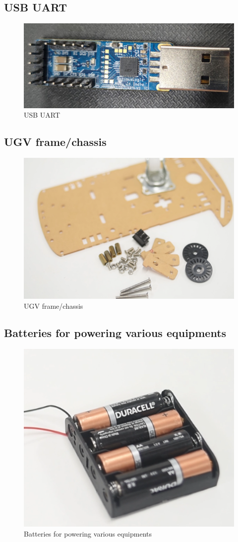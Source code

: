 \begin{enumerate}[label=\thesection.\arabic*.,ref=\thesection.\theenumi]
\subsection{USB UART}
\begin{figure}[H]
\centering
\includegraphics[width=0.5\columnwidth]{figs/uart.jpg}
\caption{USB UART}
\label{fig:usb-uart}
\end{figure}
\subsection{UGV frame/chassis}
\begin{figure}[H]
\centering
\includegraphics[width=0.5\columnwidth]{figs/base.png}
\caption{UGV frame/chassis}
\end{figure}


\subsection{Batteries for powering various equipments}
\begin{figure}[H]
\centering
\includegraphics[width=0.5\columnwidth]{figs/battery.png}
\caption{Batteries for powering various equipments}
\end{figure}


\end{enumerate}
